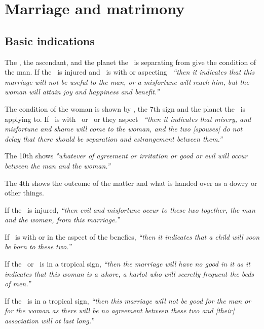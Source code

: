 \section{Marriage and matrimony}
\subsection{Basic indications}
The \Sun, the ascendant, and the planet the \Moon\, is separating from give the condition of the man. If the \Sun\, is injured and  \Venus\, is with or aspecting \Jupiter\, \textsl{``then it indicates that this marriage will not be useful to the man, or a misfortune will reach him, but the woman will attain joy and happiness and benefit.''}

The condition of the woman is shown by \Venus, the 7th sign and the planet the \Moon\, is applying to. If \Venus\, is with \Mars\, or \Saturn\, or they aspect \Venus\, \textsl{``then it indicates that misery, and misfortune and shame will come to the woman, and the two [spouses] do not delay that there should be separation and estrangement between them.''}

The 10th shows \textsl{"whatever of agreement or irritation or good or evil will occur between the man and the woman.''}

The 4th shows the outcome of the matter and what is handed over as a dowry or other things.

If the \Moon\, is injured, \textsl{``then evil and misfortune occur to these two together, the man and the woman, from this marriage.''}

If \Mercury\, is with or in the aspect of the benefics, \textsl{``then it indicates that a child will soon be born to these two.''}

If the \Moon\, or \Venus\, is in a tropical sign, \textsl{``then the marriage will have no good in it as it indicates that this woman is a whore, a harlot who will secretly frequent the beds of men.''}

If the \Moon\, is in a tropical sign, \textsl{``then this marriage will not be good for the man or for the woman as there will be no agreement between these two and [their] association will ot last long.''}

